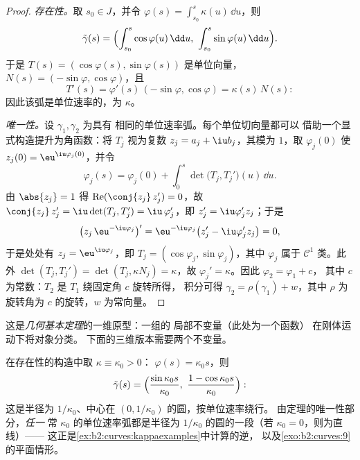 \begin{proof}
\emph{存在性。}取 $s_0 \in J$，并令 $\varphi(s) =
\int_{s_0}^s \kappa(u)\,\dd u$，则
\[
\tilde\gamma(s) = \Bigl(\int_{s_0}^s \cos\varphi(u)\,\dd u,\
\int_{s_0}^s \sin\varphi(u)\,\dd u\Bigr).
\]
于是 $T(s) = (\cos\varphi(s), \sin\varphi(s))$ 是单位向量，
$N(s) = (-\sin\varphi, \cos\varphi)$，且
\[
T'(s) = \varphi'(s)\,(-\sin\varphi, \cos\varphi)
= \kappa(s)\,N(s) :
\]
因此该弧是单位速率的，为 $\kappa$。

\emph{唯一性。}设 $\gamma_1, \gamma_2$ 为具有
相同的单位速率弧。每个单位切向量都可以
借助一个显式构造提升为角函数：将 $T_j$ 视为复数
$z_j = a_j + \iu b_j$，其模为 $1$，取
$\varphi_j(0)$ 使 $z_j(0) = \eu^{\iu\varphi_j(0)}$，并令
\[
\varphi_j(s) = \varphi_j(0) + \int_0^s\det\bigl(T_j,
T_j'\bigr)(u)\,\dd u .
\]
由 $\abs{z_j} = 1$ 得 $\operatorname{Re}(\conj{z_j}\,z_j') =
0$，故 $\conj{z_j}\,z_j' = \iu\det(T_j, T_j') =
\iu\,\varphi_j'$，即 $z_j' = \iu\varphi_j'z_j$；于是
\[
\bigl(z_j\,\eu^{-\iu\varphi_j}\bigr)'
= \eu^{-\iu\varphi_j}\bigl(z_j' - \iu\varphi_j'z_j\bigr) = 0,
\]
于是处处有 $z_j = \eu^{\iu\varphi_j}$，即 $T_j =
(\cos\varphi_j, \sin\varphi_j)$，其中 $\varphi_j$ 属于
$\mathcal C^1$ 类。此外 $\det(T_j, T_j') = \det(T_j,
\kappa N_j) = \kappa$，故 $\varphi_j' = \kappa$。因此 $\varphi_2 = \varphi_1 + c$，
其中 $c$ 为常数：$T_2$ 是 $T_1$ 绕固定角 $c$ 旋转所得，
积分可得 $\gamma_2 = \rho(\gamma_1) + w$，其中 $\rho$ 为
旋转角为 $c$ 的旋转，$w$ 为常向量。
\end{proof}

\begin{remark}
这是\emph{几何基本定理}的一维原型：一组的
局部不变量（此处为一个函数）
在刚体运动下将对象分类。
下面的三维版本需要两个不变量。
\end{remark}

\begin{example}[常曲率
即圆]\label{ex:b2:curves:constantkappa}
在存在性的构造中取 $\kappa \equiv \kappa_0 > 0$：
$\varphi(s) = \kappa_0 s$，则
\[
\tilde\gamma(s) = \Bigl(\frac{\sin\kappa_0s}{\kappa_0},\
\frac{1 - \cos\kappa_0s}{\kappa_0}\Bigr) :
\]
这是半径为 $1/\kappa_0$、中心在 $(0,
1/\kappa_0)$ 的圆，按单位速率绕行。
由定理的唯一性部分，\emph{任一}
常 $\kappa_0$ 的单位速率弧都是半径为
$1/\kappa_0$ 的圆的一段（若 $\kappa_0 = 0$，则为直线）——
这正是\cref{ex:b2:curves:kappaexamples}中计算的逆，
以及\cref{exo:b2:curves:9}的平面情形。
\end{example}

